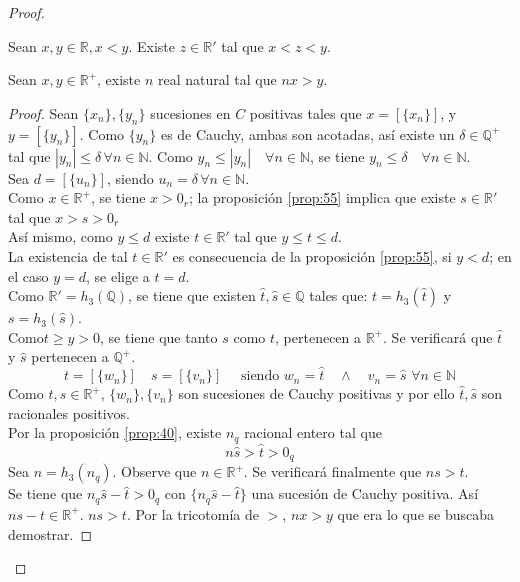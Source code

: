 \begin{proof}
\begin{proposition}\label{prop:55}
  Sean $x, y \in \mathbb{R}, x < y $. Existe $z \in \mathbb{R'}$ tal que $x < z
  < y$.
\end{proposition}
\begin{proposition}\label{prop:56} Sean $x, y \in \mathbb{R}^+$, existe $n$ real
  natural tal que $nx > y$.
\end{proposition}
\begin{proof}
  Sean $\{x_n\}, \{y_n\}$ sucesiones en $C$ positivas tales que $x=[\{x_n\}]$, y
  $y = [\{y_n\}]$. Como $\{y_n\}$ es de Cauchy, ambas son acotadas, así existe
  un $\delta \in \mathbb{Q}^+$ tal que $|y_n| \leq \delta \, \forall n \in
  \mathbb{N}$. Como $y_n \leq |y_n| \quad  \forall n \in \mathbb{N}$, se tiene $y_n
  \leq \delta \quad \forall n \in \mathbb{N}$. \\
  Sea $d = [\{u_n\}]$, siendo $u_n = \delta \, \forall n \in \mathbb{N}$. \\
  Como $x \in\mathbb{R}^+$, se tiene $x > 0_r$; la proposición \ref{prop:55}
  implica que existe $s \in \mathbb{R}'$ tal que $x > s > 0_r$ \\ 
  Así mismo, como $y \leq d$ existe $t \in \mathbb{R}'$ tal que $y \leq t \leq
  d$. \\
  La existencia de tal $t \in \mathbb{R}'$ es consecuencia de la proposición
  \ref{prop:55}, si $y < d$; en el caso $y = d$, se elige a $t =d$. \\
  Como $\mathbb{R}' = h_3(\mathbb{Q})$, se tiene que existen $\hat{t}, \hat{s}
  \in \mathbb{Q}$ tales que: $t = h_3(\hat{t}) $ y $s = h_3(\hat{s})$. \\
  Como$t \geq y > 0$, se tiene que tanto $s$ como $t$, pertenecen a
  $\mathbb{R}^+$. Se verificará que $\hat{t}$ y $\hat{s}$ pertenecen a
  $\mathbb{Q}^+$. \\
  \[
    t = [\{w_n\}] \quad s = [ \{v_n\}] \quad \mbox{ siendo } w_n=\hat{t} \quad
    \land \quad v_n = \hat{s} \, \, \forall n \in \mathbb{N}
  \]
  Como $t,s \in \mathbb{R}^+$, $\{w_n\}, \{v_n\}$ son sucesiones de Cauchy
  positivas y por ello $\hat{t}, \hat{s}$ son racionales positivos. \\

  Por la proposición \ref{prop:40}, existe $n_q$ racional entero tal que
  \[
    n\hat{s} > \hat{t} > 0_q
  \]
  Sea $n = h_3(n_q)$. Observe que $n \in \mathbb{R}^+$. Se verificará finalmente
  que $ns > t$. \\
  Se tiene que $n_q \hat{s} - \hat{t} > 0_q$ con $\{n_q\hat{s} - \hat{t}\}$ una
  sucesión de Cauchy positiva. Así $ns - t \in \mathbb{R}^+$. $ns > t$. Por la
  tricotomía de $>$, $nx > y$ que era lo que se buscaba demostrar.


\end{proof}
\end{proof}
